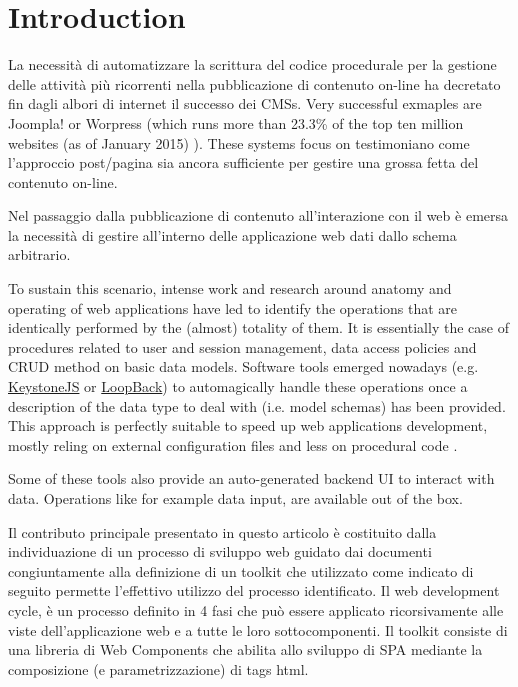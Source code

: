 \section{Introduction}\label{sec:introduction}

La necessità di automatizzare la scrittura del codice procedurale per la gestione delle attività più ricorrenti nella pubblicazione di contenuto on-line ha decretato fin dagli albori di internet il successo dei CMSs. Very successful exmaples are Joompla! or Worpress (which runs more than 23.3\% of the top ten million websites (as of January 2015) \cite{usage-cms}). These systems focus on testimoniano come l'approccio post/pagina sia ancora sufficiente per gestire una grossa fetta del contenuto on-line.

Nel passaggio dalla pubblicazione di contenuto all'interazione con il web è emersa la necessità di gestire all'interno delle applicazione web dati dallo schema arbitrario.

To sustain this scenario, intense work and research around anatomy and operating of web applications have led to identify the operations that are identically performed by the (almost) totality of them. It is essentially the case of procedures related to user and session management, data access policies and CRUD method on basic data models.
Software tools emerged nowadays (e.g. \href{http://keystonejs.com}{KeystoneJS} or \href{http://loopback.io}{LoopBack}) to automagically handle these operations once a description of the data type to deal with (i.e. model schemas) has been provided. This approach is perfectly suitable to speed up web applications development, mostly reling on external configuration files and less on procedural code \cite{6859693}.

Some of these tools also provide an auto-generated backend UI to interact with data. Operations like for example data input, are available out of the box.

Il contributo principale presentato in questo articolo è costituito dalla individuazione di un processo di sviluppo web guidato dai documenti congiuntamente alla definizione di un toolkit che utilizzato come indicato di seguito permette l'effettivo utilizzo del processo identificato. Il web development cycle, è un processo definito in 4 fasi che può essere applicato ricorsivamente alle viste dell'applicazione web e a tutte le loro sottocomponenti. Il toolkit consiste di una libreria di Web Components che abilita allo sviluppo di SPA mediante la composizione (e parametrizzazione) di tags html.

